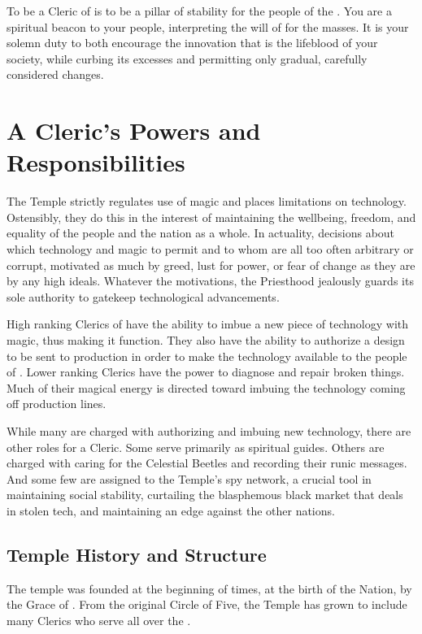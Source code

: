 \documentclass[blue]{GL2020}
\begin{document}
\name{\bFPFCleric{}}

To be a Cleric of \cTechGod{} is to be a pillar of stability for the people of the \pTech{}. You are a spiritual beacon to your people, interpreting the will of \cTechGod{} for the masses. It is your solemn duty to both encourage the innovation that is the lifeblood of your society, while curbing its excesses and permitting only gradual, carefully considered changes.  

\section*{A Cleric's Powers and Responsibilities}
The Temple strictly regulates use of magic and places limitations on technology. Ostensibly, they do this in the interest of maintaining the wellbeing, freedom, and equality of the people and the nation as a whole. In actuality, decisions about which technology and magic to permit and to whom are all too often arbitrary or corrupt, motivated as much by greed, lust for power, or fear of change as they are by any high ideals.  Whatever the motivations, the Priesthood jealously guards its sole authority to gatekeep technological advancements.

High ranking Clerics of \cTechGod{} have the ability to imbue a new piece of technology with magic, thus making it function. They also have the ability to authorize a design to be sent to production in order to make the technology available to the people of \pTech{}. Lower ranking Clerics have the power to diagnose and repair broken things. Much of their magical energy is directed toward imbuing the technology coming off production lines.

While many are charged with authorizing and imbuing new technology, there are other roles for a Cleric. Some serve primarily as spiritual guides. Others are charged with caring for the Celestial Beetles and recording their runic messages. And some few are assigned to the Temple’s spy network, a crucial tool in maintaining social stability, curtailing the blasphemous black market that deals in stolen tech, and maintaining an edge against the other nations.

\subsection*{Temple History and Structure}
The temple was founded at the beginning of times, at the birth of the Nation, by the Grace of \cTechGod{}. From the original Circle of Five, the Temple has grown to include many Clerics who serve all over the \pTech{}.
\end{document}
